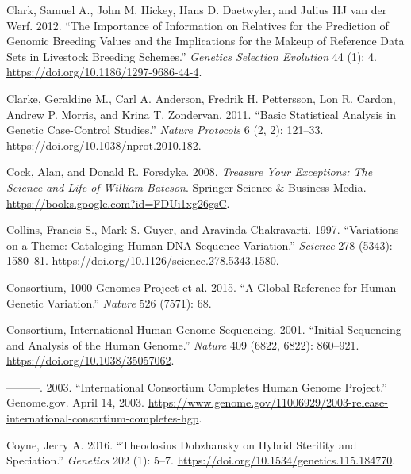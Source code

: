 \documentclass[
]{book}
\newlength{\cslhangindent}
\newlength{\cslentryspacingunit} %
\newenvironment{CSLReferences}[2] %
 {%
  \setlength{\parindent}{0pt}
  \ifodd #1
  \let\oldpar\par
  \def\par{\hangindent=\cslhangindent\oldpar}
  \fi
  \setlength{\parskip}{#2\cslentryspacingunit}
 }%
 {}
\begin{document}
\begin{CSLReferences}{1}{0}
\leavevmode{}%
Clark, Samuel A., John M. Hickey, Hans D. Daetwyler, and Julius HJ van der Werf. 2012. {``The Importance of Information on Relatives for the Prediction of Genomic Breeding Values and the Implications for the Makeup of Reference Data Sets in Livestock Breeding Schemes.''} \emph{Genetics Selection Evolution} 44 (1): 4. \url{https://doi.org/10.1186/1297-9686-44-4}.

\leavevmode{}%
Clarke, Geraldine M., Carl A. Anderson, Fredrik H. Pettersson, Lon R. Cardon, Andrew P. Morris, and Krina T. Zondervan. 2011. {``Basic Statistical Analysis in Genetic Case-Control Studies.''} \emph{Nature Protocols} 6 (2, 2): 121--33. \url{https://doi.org/10.1038/nprot.2010.182}.

\leavevmode{}%
Cock, Alan, and Donald R. Forsdyke. 2008. \emph{Treasure {Your Exceptions}: {The Science} and {Life} of {William Bateson}}. {Springer Science \& Business Media}. \url{https://books.google.com?id=FDUi1xg26gsC}.

\leavevmode{}%
Collins, Francis S., Mark S. Guyer, and Aravinda Chakravarti. 1997. {``Variations on a {Theme}: {Cataloging Human DNA Sequence Variation}.''} \emph{Science} 278 (5343): 1580--81. \url{https://doi.org/10.1126/science.278.5343.1580}.

\leavevmode{}%
Consortium, 1000 Genomes Project et al. 2015. {``A Global Reference for Human Genetic Variation.''} \emph{Nature} 526 (7571): 68.

\leavevmode{}%
Consortium, International Human Genome Sequencing. 2001. {``Initial Sequencing and Analysis of the Human Genome.''} \emph{Nature} 409 (6822, 6822): 860--921. \url{https://doi.org/10.1038/35057062}.

\leavevmode{}%
---------. 2003. {``International {Consortium Completes Human Genome Project}.''} {Genome.gov}. April 14, 2003. \url{https://www.genome.gov/11006929/2003-release-international-consortium-completes-hgp}.

\leavevmode{}%
Coyne, Jerry A. 2016. {``Theodosius {Dobzhansky} on {Hybrid Sterility} and {Speciation}.''} \emph{Genetics} 202 (1): 5--7. \url{https://doi.org/10.1534/genetics.115.184770}.


\end{CSLReferences}
\end{document}

